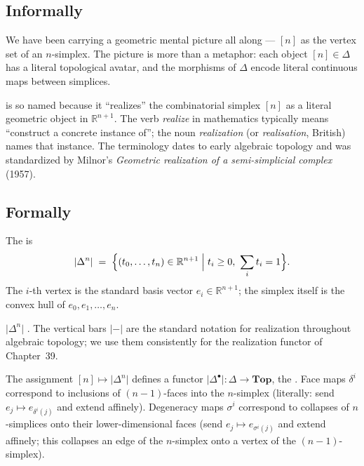 \subsection{Informally}

We have been carrying a geometric mental picture all along — $[n]$ as
the vertex set of an $n$-simplex. The picture is more than a metaphor:
each object $[n] \in \Delta$ has a literal topological avatar, and the
morphisms of $\Delta$ encode literal continuous maps between simplices.

\begin{nameorigin}
 is so named because it ``realizes'' the
combinatorial simplex $[n]$ as a literal geometric object in $\mathbb{R}^{n+1}$.
The verb \emph{realize} in mathematics typically means ``construct a
concrete instance of''; the noun \emph{realization} (or \emph{realisation},
British) names that instance. The terminology dates to early algebraic
topology and was standardized by Milnor's \emph{Geometric realization of
a semi-simplicial complex} (1957).
\end{nameorigin}

\subsection{Formally}

\begin{definition}
\label{def:topological-simplex}
The  is
\begin{equation*}
  \lvert\Delta^n\rvert \;=\; \Bigl\{ (t_0, \ldots, t_n) \in \mathbb{R}^{n+1}
  \;\Big|\; t_i \geq 0, \ \sum_i t_i = 1 \Bigr\}.
\end{equation*}
The $i$-th vertex is the standard basis vector $e_i \in \mathbb{R}^{n+1}$;
the simplex itself is the convex hull of $e_0, e_1, \ldots, e_n$.
\end{definition}

\begin{howtosay}
$\lvert\Delta^n\rvert$ . The vertical bars $\lvert{-}\rvert$ are the
standard notation for realization throughout algebraic topology; we use
them consistently for the realization functor of Chapter~39.
\end{howtosay}

\begin{remark}
The assignment $[n] \mapsto \lvert\Delta^n\rvert$ defines a functor
$\lvert\Delta^\bullet\rvert : \Delta \to \mathbf{Top}$, the
. Face maps $\delta^i$
correspond to inclusions of $(n-1)$-faces into the $n$-simplex
(literally: send $e_j \mapsto e_{\delta^i(j)}$ and extend affinely).
Degeneracy maps $\sigma^i$ correspond to collapses of $n$-simplices onto
their lower-dimensional faces (send $e_j \mapsto e_{\sigma^i(j)}$ and
extend affinely; this collapses an edge of the $n$-simplex onto a
vertex of the $(n-1)$-simplex).
\end{remark}

